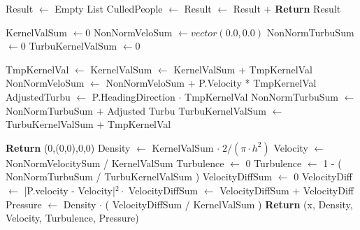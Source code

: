 \begin{center}
\label{alg:revised_algorithm}
\begin{algorithmic}[1]
\label{firstfunc}
\State Result $\gets$ Empty List 
    \State CulledPeople $\gets$  
    \State Result $\gets$ Result + 
\EndFor
\State \textbf{Return} Result

\EndFunction

\label{secondfunc}


\State KernelValSum $\gets 0$\label{firstval}
\State NonNormVeloSum $\gets vector(0.0,0.0)$\label{veloval}
\State NonNormTurbuSum $\gets 0$
\State TurbuKernelValSum $\gets 0$\label{lastval}


    \State TmpKernelVal $\gets$ \label{tmpkernel}
    \State KernelValSum $\gets$ KernelValSum + TmpKernelVal
    \State NonNormVeloSum $\gets$ NonNormVeloSum + P.Velocity * TmpKernelVal
    \label{validhead}
        \State AdjustedTurbu $\gets$ P.HeadingDirection $\cdot$ TmpKernelVal\label{adjustturbu}
        \State NonNormTurbuSum $\gets$ NonNormTurbuSum $+$ Adjusted Turbu \label{turbusum}
        \State TurbuKernelValSum $\gets$ TurbuKernelValSum + TmpKernelVal\label{turbukernel}
    \EndIf
\EndFor

\label{nullcheck}
    \State \textbf{Return} (0,(0,0),0,0)
\Else
    \State Density $\gets$ KernelValSum $\cdot \; 2 / (\pi \cdot h^2)$\label{firstres}
    \State Velocity $\gets$ NonNormVelocitySum / KernelValSum \label{secondres}
    \State Turbulence $\gets$ 0
     \label{turbunullcheck}
        \State Turbulence $\gets$ 1 - ( NonNormTurbuSum / TurbuKernelValSum )\label{thirdres}
    \EndIf
    \State VelocityDiffSum $\gets$ 0 \label{firstpres}
        \State VelocityDiff $\gets$ |P.velocity - Velocity|$^2 \cdot$ \label{secondkernel}
        \State VelocityDiffSum $\gets$ VelocityDiffSum $+$ VelocityDiff
    \EndFor
    \State Pressure $\gets$ Density $\cdot$ ( VelocityDiffSum / KernelValSum )\label{lastpres}
\State \textbf{Return} (x, Density, Velocity, Turbulence, Pressure)\label{return}
\EndIf
\EndFunction
\end{algorithmic}
\end{center}